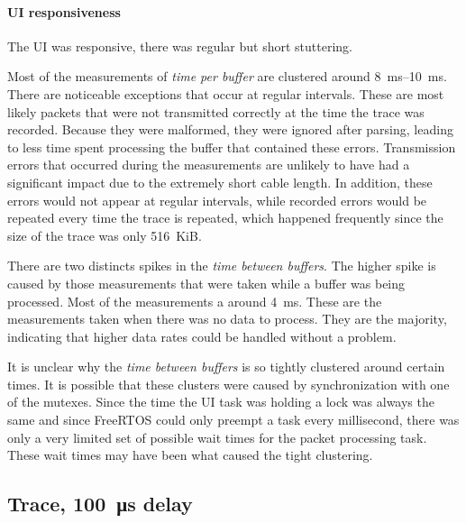\paragraph{UI responsiveness}

The UI was responsive, there was regular but short stuttering.
\bigbreak

Most of the measurements of \textit{time per buffer} are clustered around \SIrange{8}{10}{\milli\second}.
There are noticeable exceptions that occur at regular intervals. These are most likely packets that
were not transmitted correctly at the time the trace was recorded. Because they were malformed, they
were ignored after parsing, leading to less time spent processing the buffer that contained these
errors. Transmission errors that occurred during the measurements are unlikely to have had a significant
impact due to the extremely short cable length. In addition, these errors would not appear at regular
intervals, while recorded errors would be repeated every time the trace is repeated, which happened
frequently since the size of the trace was only \SI{516}{KiB}.

There are two distincts spikes in the \textit{time between buffers}. The higher spike is caused by
those measurements that were taken while a buffer was being processed. Most of the measurements a
around \SI{4}{\milli\second}. These are the measurements taken when there was no data to process.
They are the majority, indicating that higher data rates could be handled without a problem.

It is unclear why the \textit{time between buffers} is so tightly clustered around certain times.
It is possible that these clusters were caused by synchronization with one of the mutexes. Since the
time the UI task was holding a lock was always the same and since FreeRTOS could only preempt a task
every millisecond, there was only a very limited set of possible wait times for the packet processing
task. These wait times may have been what caused the tight clustering.

\clearpage
\subsection{Trace, \SI{100}{\micro\second} delay}
\label{evaluation/results/trace-100us-delay}

